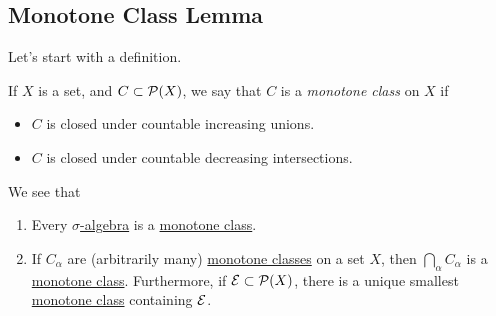 \subsection{Monotone Class Lemma}
Let's start with a definition.
\begin{definition}\label{def:monotone-class}
	If \(X\) is a set, and \(C\subset \mathcal{\MakeUppercase{p}} (X)\), we say that \(C\) is a \emph{monotone class} on \(X\) if
	\begin{itemize}
		\item \(C\) is closed under countable increasing unions.
		\item \(C\) is closed under countable decreasing intersections.
	\end{itemize}
\end{definition}

\begin{eg}
	We see that
	\begin{enumerate}
		\item Every \hyperref[def:sigma-algebra]{\(\sigma\)-algebra} is a \hyperref[def:monotone-class]{monotone class}.
		\item If \(C_\alpha \) are (arbitrarily many) \hyperref[def:monotone-class]{monotone classes} on a set \(X\), then \(\bigcap\limits_{\alpha}C_\alpha  \)
		      is a \hyperref[def:monotone-class]{monotone class}. Furthermore, if \(\mathcal{\MakeUppercase{e}} \subset \mathcal{\MakeUppercase{p}} (X)\), there is a unique smallest
		      \hyperref[def:monotone-class]{monotone class} containing \(\mathcal{\MakeUppercase{e}}\).
	\end{enumerate}
\end{eg}

